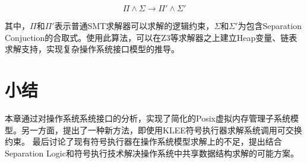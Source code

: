 \begin{equation}
	\Pi \land \Sigma \to \Pi' \land \Sigma'
\end{equation}

其中，$\Pi$和$\Pi'$表示普通SMT求解器可以求解的逻辑约束，$\Sigma$和$\Sigma'$为包含Separation
Conjuction的合取式。使用此算法，可以在Z3等求解器之上建立Heap变量、链表求解支持，实现复杂操作系统接口模型的推导。

\section{小结}
本章通过对操作系统系统接口的分析，实现了简化的Posix虚拟内存管理子系统模型。另一方面，提出了一种新方法，即使用KLEE符号执行器求解系统调用可交换约束。
最后讨论了现有符号执行器在操作系统模型求解上的不足，提出结合Separation
Logic和符号执行技术解决操作系统中共享数据结构求解的可能方案。
